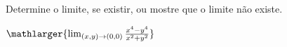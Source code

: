 Determine o limite, se existir, ou mostre que o limite não existe.

\item$\mathlarger{\lim_{(x,y)\rightarrow(0,0)} \frac{x^4-y^4}{x^2+y^2}}$